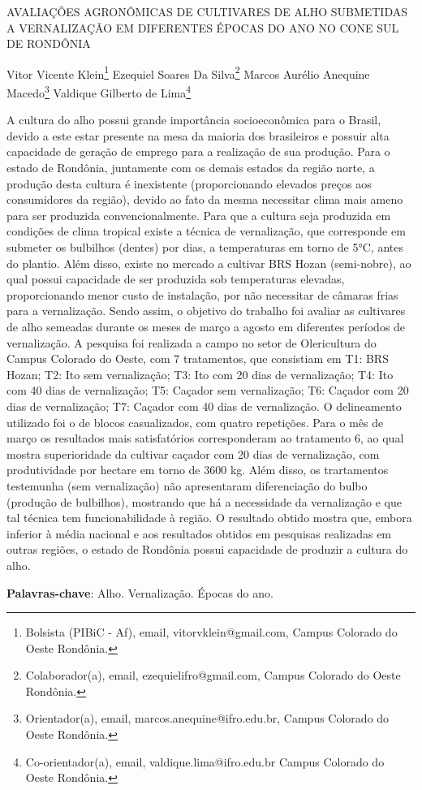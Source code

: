 \documentclass[article,12pt,onesidea,4paper,english,brazil]{abntex2}
\begin{document}
	
	
	\frenchspacing 
	
	\begin{center}
		\LARGE AVALIAÇÕES AGRONÔMICAS DE CULTIVARES DE ALHO SUBMETIDAS A
		VERNALIZAÇÃO EM DIFERENTES ÉPOCAS DO ANO NO CONE SUL DE	
		RONDÔNIA
		
		\normalsize
		Vitor Vicente Klein\footnote{Bolsista (PIBiC - Af), email, vitorvklein@gmail.com, Campus Colorado do Oeste Rondônia.} 
		Ezequiel Soares Da Silva\footnote{Colaborador(a), email, ezequielifro@gmail.com, Campus Colorado do Oeste Rondônia.} 
		Marcos Aurélio Anequine Macedo\footnote{Orientador(a), email, marcos.anequine@ifro.edu.br, Campus Colorado do Oeste Rondônia.} 
		Valdique Gilberto de Lima\footnote{Co-orientador(a), email, valdique.lima@ifro.edu.br Campus Colorado do Oeste Rondônia.} 
	\end{center}
	
	\noindent A cultura do alho possui grande importância socioeconômica para o Brasil, devido a
	este estar presente na mesa da maioria dos brasileiros e possuir alta capacidade de
	geração de emprego para a realização de sua produção. Para o estado de
	Rondônia, juntamente com os demais estados da região norte, a produção desta
	cultura é inexistente (proporcionando elevados preços aos consumidores da região),
	devido ao fato da mesma necessitar clima mais ameno para ser produzida
	convencionalmente. Para que a cultura seja produzida em condições de clima
	tropical existe a técnica de vernalização, que corresponde em submeter os bulbilhos
	(dentes) por dias, a temperaturas em torno de 5°C, antes do plantio. Além disso,
	existe no mercado a cultivar BRS Hozan (semi-nobre), ao qual possui capacidade de
	ser produzida sob temperaturas elevadas, proporcionando menor custo de
	instalação, por não necessitar de câmaras frias para a vernalização. Sendo assim, o
	objetivo do trabalho foi avaliar as cultivares de alho semeadas durante os meses de
	março a agosto em diferentes períodos de vernalização. A pesquisa foi realizada a
	campo no setor de Olericultura do Campus Colorado do Oeste, com 7 tratamentos,
	que consistiam em T1: BRS Hozan; T2: Ito sem vernalização; T3: Ito com 20 dias de
	vernalização; T4: Ito com 40 dias de vernalização; T5: Caçador sem vernalização;
	T6: Caçador com 20 dias de vernalização; T7: Caçador com 40 dias de vernalização.
	O delineamento utilizado foi o de blocos casualizados, com quatro repetições. Para o
	mês de março os resultados mais satisfatórios corresponderam ao tratamento 6, ao
	qual mostra superioridade da cultivar caçador com 20 dias de vernalização, com
	produtividade por hectare em torno de 3600 kg. Além disso, os trartamentos
	testemunha (sem vernalização) não apresentaram diferenciação do bulbo (produção
	de bulbilhos), mostrando que há a necessidade da vernalização e que tal técnica
	tem funcionabilidade à região. O resultado obtido mostra que, embora inferior à
	média nacional e aos resultados obtidos em pesquisas realizadas em outras regiões,
	o estado de Rondônia possui capacidade de produzir a cultura do alho.
	
	\vspace{\onelineskip}
	
	\noindent
	\textbf{Palavras-chave}: Alho. Vernalização. Épocas do ano.
	
\end{document}
